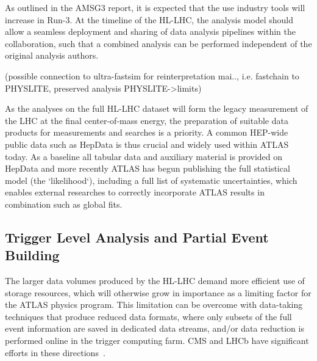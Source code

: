 As outlined in the AMSG3 report, it is expected that the use industry tools will increase in Run-3. At the timeline of the HL-LHC, the analysis model should allow a seamless deployment and sharing of data analysis pipelines within the collaboration, such that a combined analysis can be performed independent of the original analysis authors.

(possible connection to ultra-fastsim for reinterpretation mai.., i.e. fastchain to PHYSLITE, preserved analysis PHYSLITE->limits)

As the analyses on the full HL-LHC dataset will form the legacy measurement of the LHC at the final center-of-mass energy, the preparation of suitable data products for measurements and searches is a priority. A common HEP-wide public data such as HepData is thus crucial and widely used within ATLAS today. As a baseline all tabular data and auxiliary material is provided on HepData and more recently ATLAS has begun publishing the full statistical model (the `likelihood`), including a full list of systematic uncertainties, which enables external researches to correctly incorporate ATLAS results in combination such as global fits.

\subsection{Trigger Level Analysis and Partial Event Building}



The larger data volumes produced by the HL-LHC demand more efficient use of storage resources, which will otherwise grow in importance as a limiting factor for the ATLAS physics program.
This limitation can be overcome with data-taking techniques that produce reduced data formats, where only subsets of the full event information are saved in dedicated data streams, and/or data reduction is performed online in the trigger computing farm. CMS and LHCb have significant efforts in these directions~\cite{??,HSF}.

